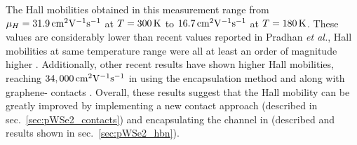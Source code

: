 \noindent The Hall mobilities obtained in this measurement range from $\mu_H=31.9\,\mathrm{cm}^{2}\mathrm{V}^{-1}\mathrm{s}^{-1}$ at $T=300\,\mathrm{K}$ to $16.7\,\mathrm{cm}^{2}\mathrm{V}^{-1}\mathrm{s}^{-1}$ at $T=180\,\mathrm{K}$. These values are considerably lower than recent values reported in Pradhan \emph{et al.}, Hall mobilities at same temperature range were all at least an order of magnitude higher \cite{Pradhan_SciReports2015}. Additionally, other recent results have shown higher Hall mobilities, reaching $34,000\,\mathrm{cm}^{2}\mathrm{V}^{-1}\mathrm{s}^{-1}$ in  using the \hbn encapsulation method and  along with graphene- contacts \cite{Li_NatureNano2015}. Overall, these results suggest that the Hall mobility can be greatly improved by implementing a new contact approach (described in sec.~\ref{sec:pWSe2_contacts}) and encapsulating the channel in \hbn (described and results shown in sec.~\ref{sec:pWSe2_hbn}). 

